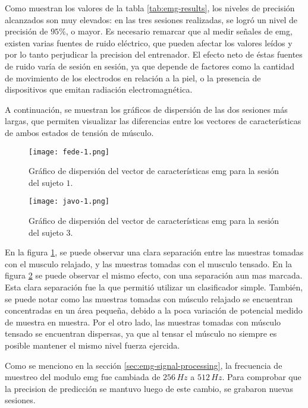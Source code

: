 Como muestran los valores de la tabla \ref{tab:emg-results}, los niveles de precisión alcanzados son muy elevados: en las tres sesiones realizadas, se logró un nivel de precisión de $95\%$, o mayor. Es necesario remarcar que al medir señales de \acrshort{emg}, existen varias fuentes de ruido eléctrico, que pueden afectar los valores leídos y por lo tanto perjudicar la precision del entrenador. El efecto neto de éstas fuentes de ruido varía de sesión en sesión, ya que depende de factores como la cantidad de movimiento de los electrodos en relación a la piel, o la presencia de dispositivos que emitan radiación electromagnética\cite{emg-delsys}.

A continuación, se muestran los gráficos de dispersión de las dos sesiones más largas, que permiten visualizar las diferencias entre los vectores de características de ambos estados de tensión de músculo.

 \begin{figure}[H]
	\centering
    \texttt{[image: fede-1.png]}
    \caption{Gráfico de dispersión del vector de características \acrshort{emg} para la sesión del sujeto $1$.}
	\label{fig:emg-graph-s1}
\end{figure}

 \begin{figure}[H]
	\centering
    \texttt{[image: javo-1.png]}
    \caption{Gráfico de dispersión del vector de características \acrshort{emg} para la sesión del sujeto $3$.}
	\label{fig:emg-graph-s3}
\end{figure}

En la figura \ref{fig:emg-graph-s1}, se puede observar una clara separación entre las muestras tomadas con el musculo relajado, y las muestras tomadas con el musculo tensado. En la figura \ref{fig:emg-graph-s3} se puede observar el mismo efecto, con una separación aun mas marcada. Esta clara separación fue la que permitió utilizar un clasificador simple. También, se puede notar como las muestras tomadas con músculo relajado se encuentran concentradas en un área pequeña, debido a la poca variación de potencial medido de muestra en muestra. Por el otro lado, las muestras tomadas con músculo tensado se encuentran dispersas, ya que al tensar el músculo no siempre es posible mantener el mismo nivel fuerza ejercida.

Como se menciono en la sección \ref{sec:emg-signal-processing}, la frecuencia de muestreo del modulo \acrshort{emg} fue cambiada de $256\,Hz$ a $512\,Hz$. Para comprobar que la precision de predicción se mantuvo luego de este cambio, se grabaron nuevas sesiones.

